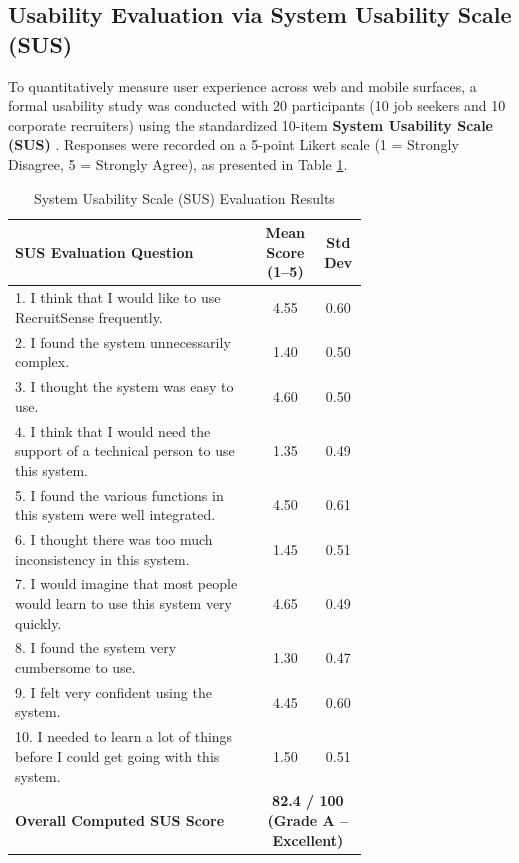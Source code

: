 \subsection{Usability Evaluation via System Usability Scale (SUS)}
To quantitatively measure user experience across web and mobile surfaces, a formal usability study was conducted with 20 participants (10 job seekers and 10 corporate recruiters) using the standardized 10-item \textbf{System Usability Scale (SUS)} \cite{brooke1996sus}. Responses were recorded on a 5-point Likert scale (1 = Strongly Disagree, 5 = Strongly Agree), as presented in Table \ref{tab:sus_evaluation}.

\begin{table}[h!]
\centering
\small
\caption{System Usability Scale (SUS) Evaluation Results}
\label{tab:sus_evaluation}
\begin{tabular}{|p{0.70\linewidth}|c|c|}
\hline
\textbf{SUS Evaluation Question} & \textbf{Mean Score (1--5)} & \textbf{Std Dev} \\ \hline
1. I think that I would like to use RecruitSense frequently. & 4.55 & 0.60 \\ \hline
2. I found the system unnecessarily complex. & 1.40 & 0.50 \\ \hline
3. I thought the system was easy to use. & 4.60 & 0.50 \\ \hline
4. I think that I would need the support of a technical person to use this system. & 1.35 & 0.49 \\ \hline
5. I found the various functions in this system were well integrated. & 4.50 & 0.61 \\ \hline
6. I thought there was too much inconsistency in this system. & 1.45 & 0.51 \\ \hline
7. I would imagine that most people would learn to use this system very quickly. & 4.65 & 0.49 \\ \hline
8. I found the system very cumbersome to use. & 1.30 & 0.47 \\ \hline
9. I felt very confident using the system. & 4.45 & 0.60 \\ \hline
10. I needed to learn a lot of things before I could get going with this system. & 1.50 & 0.51 \\ \hline
\textbf{Overall Computed SUS Score} & \multicolumn{2}{c|}{\textbf{82.4 / 100 (Grade A -- Excellent)}} \\ \hline
\end{tabular}
\end{table}

